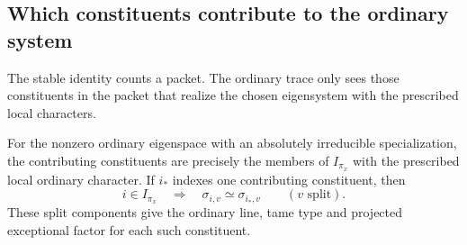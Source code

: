 \subsection{Which constituents contribute to the ordinary system}

The stable identity counts a packet. The ordinary trace only sees those constituents in the packet that realize the chosen eigensystem with the prescribed local characters.

\begin{lemma}
\label{lem:ordinary-contributing-constituents}
For the nonzero ordinary eigenspace with an absolutely irreducible
specialization, the contributing constituents are precisely the
members of \(I_{\pi_x}\) with the prescribed local ordinary character.
If \(i_*\) indexes one contributing constituent, then
\[
 i\in I_{\pi_x}\quad\Longrightarrow\quad
     \sigma_{i,v}\simeq\sigma_{i_*,v}\qquad(v\text{ split}).
\]
These split components give the ordinary line, tame type and
projected exceptional factor for each such constituent.
\end{lemma}

